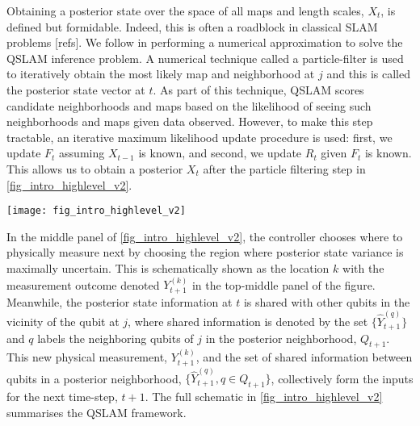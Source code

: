 Obtaining a posterior state over the space of all maps and length scales, $X_t$, is defined but formidable. Indeed, this is often a roadblock in classical SLAM problems [refs]. We follow \cite{thrun2001probabilistic} in performing a numerical approximation to solve the QSLAM inference problem. A numerical technique called a particle-filter is used to iteratively obtain the most likely map and neighborhood at $j$ and this is called the posterior state vector at $t$. As part of this technique, QSLAM scores candidate neighborhoods and maps based on the likelihood of seeing such neighborhoods and maps  given data observed. However, to make this step tractable, an iterative maximum likelihood update procedure is used: first, we update $F_t$ assuming $X_{t-1}$ is known, and second, we update $R_t$ given $F_t$ is known. This allows us to obtain a posterior $X_t$ after the particle filtering  step in \cref{fig_intro_highlevel_v2}.
\begin{figure*}
	\texttt{[image: fig\_intro\_highlevel\_v2]}
	\caption{\label{fig_intro_highlevel_v2}}    	
\end{figure*} 

In the middle panel of \cref{fig_intro_highlevel_v2}, the controller chooses where to physically measure next by choosing the region where posterior state variance is maximally uncertain. This is schematically shown as the location $k$ with the measurement outcome denoted $Y_{t+1}^{(k)}$ in the top-middle panel of the figure. Meanwhile, the posterior state information at $t$ is shared with other qubits in the vicinity of the qubit at $j$, where shared information is denoted by the set $\{\hat{Y}_{t+1}^{(q)} \}$ and $q$ labels the neighboring qubits of $j$ in the posterior neighborhood, $Q_{t+1}$. This new physical measurement, $Y_{t+1}^{(k)}$,  and the set of shared information between qubits in a posterior neighborhood, $\{\hat{Y}_{t+1}^{(q)}, q \in Q_{t+1}\}$,  collectively form the inputs for the next time-step, $t+1$. The full schematic in \cref{fig_intro_highlevel_v2} summarises the QSLAM framework.

